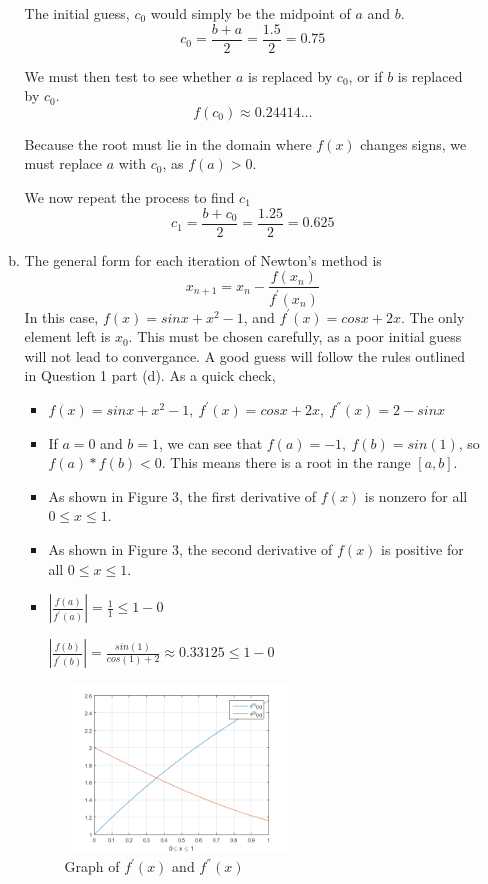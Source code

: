 \documentclass[11pt]{article}
\begin{document}
\begin{enumerate}
\begin{enumerate}[(a)]
		The initial guess, $c_0$ would simply be the midpoint of $a$ and $b$.
		$$c_0 = \frac{b+a}{2} = \frac{1.5}{2} = 0.75$$

		We must then test to see whether $a$ is replaced by $c_0$, or if $b$ is replaced by $c_0$.
		$$f(c_0) \approx 0.24414\dots$$

		Because the root must lie in the domain where $f(x)$ changes signs, we must replace $a$ with $c_0$, as $f(a) > 0$.

		We now repeat the process to find $c_1$
		$$c_1 = \frac{b+c_0}{2} = \frac{1.25}{2} = 0.625$$

		\item The general form for each iteration of Newton's method is
		$$x_{n+1} = x_n - \frac{f(x_n)}{f^{'}(x_n)} $$
		In this case, $f(x) = sinx + x^2 - 1$, and $f^{'}(x) = cosx + 2x$. The only element left is $x_0$. This must be chosen
		carefully, as a poor initial guess will not lead to convergance. A good guess will follow the rules outlined in Question 1
		part (d). As a quick check,

		\begin{itemize}
			\item $f(x) = sinx + x^2 - 1,\ f^{'}(x) = cosx+2x,\ f^{''}(x) = 2-sinx$

			\item If $a = 0$ and $b=1$, we can see that $f(a) = -1,\ f(b) = sin(1)$, so $f(a)*f(b) < 0$. This means there is a
			root in the range $[a,b]$.

			\item As shown in Figure 3, the first derivative of $f(x)$ is nonzero for all $0 \leq x \leq 1$.

			\item As shown in Figure 3, the second derivative of $f(x)$ is positive for all $0 \leq x \leq 1$.

			\item $|\frac{f(a)}{f^{'}(a)}| = \frac{1}{1} \leq 1-0$

			$|\frac{f(b)}{f^{'}(b)}| = \frac{sin(1)}{cos(1) + 2} \approx 0.33125 \leq 1-0$

		\end{itemize}

		\begin{figure}[H]
			\centering
			\includegraphics[width=0.6\textwidth]{q2_derivgraph.png}
			\caption{Graph of $f^{'}(x)$ and $f^{''}(x)$}
		\end{figure}


\end{enumerate}
\end{enumerate}
\end{document}

